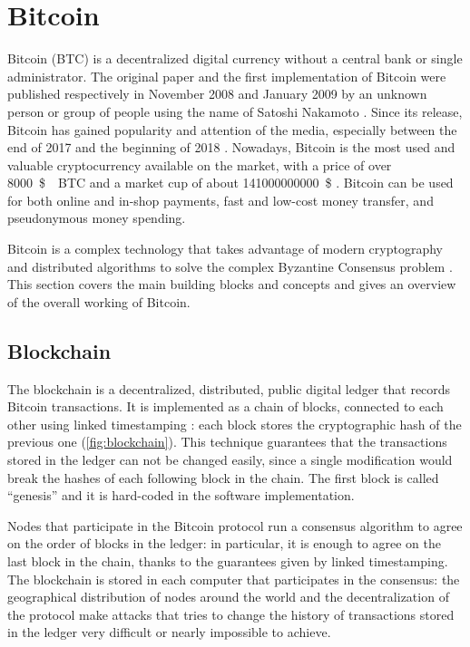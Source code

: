 \chapter{Bitcoin}
\label{chapter:bitcoin}
Bitcoin (BTC) is a decentralized digital currency without a central bank or single administrator.
The original paper \cite{bitcoin_2008} and the first implementation of Bitcoin were published respectively in November \num{2008} and January \num{2009} by an unknown person or group of people using the name of Satoshi Nakamoto \cite{bitcoin_website}.
Since its release, Bitcoin has gained popularity and attention of the media, especially between the end of \num{2017} and the beginning of \num{2018} \cite{bbc_2018, telegraph_2018, ilsole24ore_2018}.
Nowadays, Bitcoin is the most used and valuable cryptocurrency available on the market, with a price of over \SI{8000}{\$ \per BTC} and a market cup of about \SI{141000000000}{\$} \cite{bitcoin_usage_study_2017, stats_coinmarketcap, stats_coinranking, stats_cryptocompare, stats_coincheckup, stats_moonstats}.
Bitcoin can be used for both online and in-shop payments, fast and low-cost money transfer, and pseudonymous money spending.

\bigskip
Bitcoin is a complex technology that takes advantage of modern cryptography and distributed algorithms to solve the complex Byzantine Consensus problem \cite{byzantin_generals_1982}.
This section covers the main building blocks and concepts and gives an overview of the overall working of Bitcoin.

\section{Blockchain}
The blockchain is a decentralized, distributed, public digital ledger that records Bitcoin transactions.
It is implemented as a chain of blocks, connected to each other using linked timestamping \cite{bitcoin_book_narayanan_2016, hash_function_wikipedia}:
each block stores the cryptographic hash of the previous one (\cref{fig:blockchain}).
This technique guarantees that the transactions stored in the ledger can not be changed easily, since a single modification would break the hashes of each following block in the chain.
The first block is called ``genesis'' and it is hard-coded in the software implementation.

Nodes that participate in the Bitcoin protocol run a consensus algorithm to agree on the order of blocks in the ledger:
in particular, it is enough to agree on the last block in the chain, thanks to the guarantees given by linked timestamping.
The blockchain is stored in each computer that participates in the consensus:
the geographical distribution of nodes around the world and the decentralization of the protocol make attacks that tries to change the history of transactions stored in the ledger very difficult or nearly impossible to achieve.

